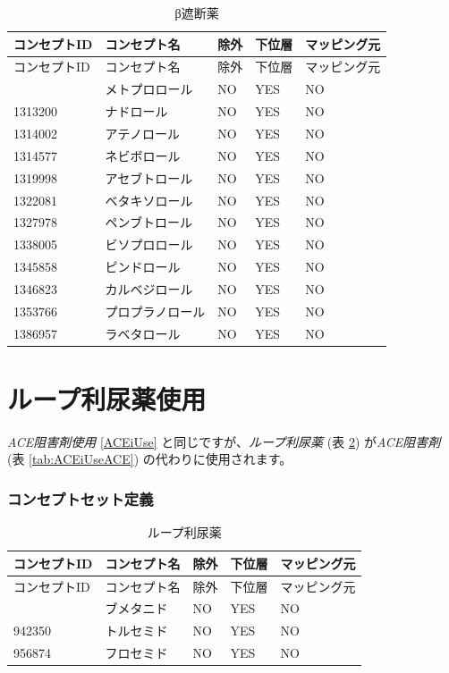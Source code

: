 \documentclass[
  11pt]{book}
\theoremstyle{definition}
\theoremstyle{definition}
\theoremstyle{definition}
\theoremstyle{definition}
\theoremstyle{remark}
\begin{document}
\begin{longtable}[]{@{}lllll@{}}
\caption{\label{tab:BBUseBB} β遮断薬}\tabularnewline
\toprule\noalign{}
コンセプトID & コンセプト名 & 除外 & 下位層 & マッピング元 \\
\midrule\noalign{}
\endfirsthead
\toprule\noalign{}
コンセプトID & コンセプト名 & 除外 & 下位層 & マッピング元 \\
\midrule\noalign{}
\endhead
\bottomrule\noalign{}
\endlastfoot
1307046 & メトプロロール & NO & YES & NO \\
1313200 & ナドロール & NO & YES & NO \\
1314002 & アテノロール & NO & YES & NO \\
1314577 & ネビボロール & NO & YES & NO \\
1319998 & アセブトロール & NO & YES & NO \\
1322081 & ベタキソロール & NO & YES & NO \\
1327978 & ペンブトロール & NO & YES & NO \\
1338005 & ビソプロロール & NO & YES & NO \\
1345858 & ピンドロール & NO & YES & NO \\
1346823 & カルベジロール & NO & YES & NO \\
1353766 & プロプラノロール & NO & YES & NO \\
1386957 & ラベタロール & NO & YES & NO \\
\end{longtable}

\section{ループ利尿薬使用}\label{DLoopUse}

\emph{ACE阻害剤使用} \ref{ACEiUse} と同じですが、\emph{ループ利尿薬} (表 \ref{tab:DLoopUseDLoops}) が\emph{ACE阻害剤} (表 \ref{tab:ACEiUseACE}) の代わりに使用されます。

\subsubsection*{コンセプトセット定義}\label{ux30b3ux30f3ux30bbux30d7ux30c8ux30bbux30c3ux30c8ux5b9aux7fa9-12}

\begin{longtable}[]{@{}lllll@{}}
\caption{\label{tab:DLoopUseDLoops} ループ利尿薬}\tabularnewline
\toprule\noalign{}
コンセプトID & コンセプト名 & 除外 & 下位層 & マッピング元 \\
\midrule\noalign{}
\endfirsthead
\toprule\noalign{}
コンセプトID & コンセプト名 & 除外 & 下位層 & マッピング元 \\
\midrule\noalign{}
\endhead
\bottomrule\noalign{}
\endlastfoot
932745 & ブメタニド & NO & YES & NO \\
942350 & トルセミド & NO & YES & NO \\
956874 & フロセミド & NO & YES & NO \\
\end{longtable}
\end{document}

